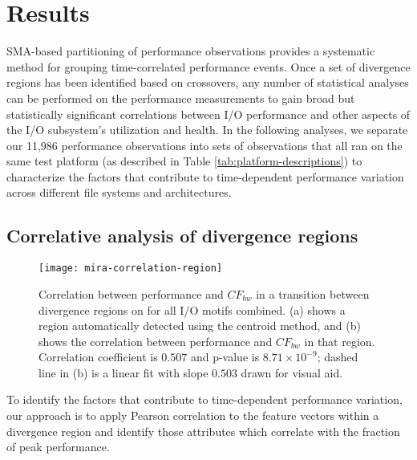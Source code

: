 \section{Results}\label{sec:results}

SMA-based partitioning of performance observations provides a systematic method for grouping time-correlated performance events.
Once a set of divergence regions has been identified based on crossovers, any number of statistical analyses can be performed on the performance measurements to gain broad but statistically significant correlations between I/O performance and other aspects of the I/O subsystem's utilization and health.
In the following analyses, we separate our 11,986 performance observations into sets of observations that all ran on the same test platform (as described in Table \ref{tab:platform-descriptions}) to characterize the factors that contribute to time-dependent performance variation across different file systems and architectures.

\subsection{Correlative analysis of divergence regions} \label{sec:results/correlate-mira}

\begin{figure}
    \centering
    \texttt{[image: mira-correlation-region]}
    \vspace{-.35in}
    \caption{Correlation between performance and $CF_{bw}$ in a transition between divergence regions on \mira for all I/O motifs combined.
    (a) shows a region automatically detected using the centroid method, and (b) shows the correlation between performance and $CF_{bw}$ in that region.
    Correlation coefficient is $0.507$ and p-value is ${8.71 \times 10^{-9}}$; dashed line in (b) is a linear fit with slope $0.503$ drawn for visual aid.}
    \label{fig:mira-correlation-region}
\end{figure}


To identify the factors that contribute to time-dependent performance variation, our approach is to apply Pearson correlation to the feature vectors within a divergence region and identify those attributes which correlate with the fraction of peak performance.

